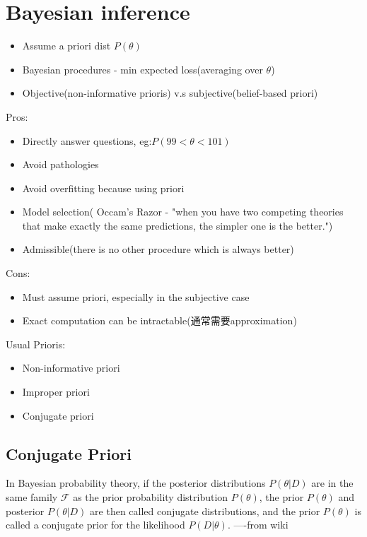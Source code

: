 \documentclass{article}
\begin{document}
\section{Bayesian inference}
\begin{itemize}
\item Assume a priori dist $P(\theta)$
\item Bayesian procedures - min expected loss(averaging over $\theta$)
\item Objective(non-informative prioris) v.s subjective(belief-based priori)
\end{itemize}

Pros:
\begin{itemize}
\item Directly answer questions, eg:$P(99 < \theta < 101)$
\item Avoid pathologies
\item Avoid overfitting because using priori
\item Model selection( Occam's Razor - "when you have two competing theories that make exactly the same predictions, the simpler one is the better.")
\item Admissible(there is no other procedure which is always better)
\end{itemize}

Cons:
\begin{itemize}
\item Must assume priori, especially in the subjective case
\item Exact computation can be intractable(通常需要approximation)
\end{itemize}

Usual Prioris:
\begin{itemize}
\item Non-informative priori
\item Improper priori
\item Conjugate priori
\end{itemize}

\subsection{Conjugate Priori}
\begin{definition}
In Bayesian probability theory, if the posterior distributions $P(\theta|D)$ are in the same family $\mathcal{F}$ as 
the prior probability distribution $P(\theta)$, the prior $P(\theta)$ and posterior $P(\theta|D)$ are then called conjugate distributions, 
and the prior $P(\theta)$ is called a conjugate prior for the likelihood $P(D|\theta)$. ----from wiki
\end{definition}
\end{document}
